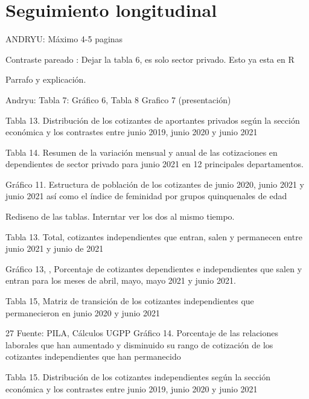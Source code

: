 \section{Seguimiento longitudinal}
ANDRYU: 
Máximo 4-5 paginas 

Contraste pareado :
Dejar la tabla 6, es solo sector privado. Esto ya esta en R 

Parrafo y explicación. 

Andryu: 
Tabla 7: 
Gráfico 6, Tabla 8 
Grafico 7 (presentación) 


Tabla 13. Distribución de los cotizantes de aportantes privados según la sección económica
y los contrastes entre junio 2019, junio 2020 y junio 2021

Tabla 14. Resumen de la variación mensual y anual de las cotizaciones en
dependientes de sector privado para junio 2021 en 12 principales departamentos.

Gráfico 11. Estructura de población de los cotizantes de junio 2020, junio 2021 y junio 2021
así como el índice de feminidad por grupos quinquenales de edad

Rediseno de las tablas. Interntar ver los dos al mismo tiempo. 


Tabla 13. Total, cotizantes independientes que entran,
salen y permanecen entre junio 2021 y junio de 2021

Gráfico 13, , Porcentaje de cotizantes dependientes e independientes que salen y entran
para los meses de abril, mayo, mayo 2021 y junio 2021.

Tabla 15, Matriz de transición de los cotizantes independientes que permanecieron
en junio 2020 y junio 2021

27
Fuente: PILA, Cálculos UGPP
Gráfico 14. Porcentaje de las relaciones laborales que han aumentado y disminuido su rango
de cotización de los cotizantes independientes que han permanecido

Tabla 15. Distribución de los cotizantes independientes según la sección económica
y los contrastes entre junio 2019, junio 2020 y junio 2021

\begin{intemize}
\item 
\end{intemize}

